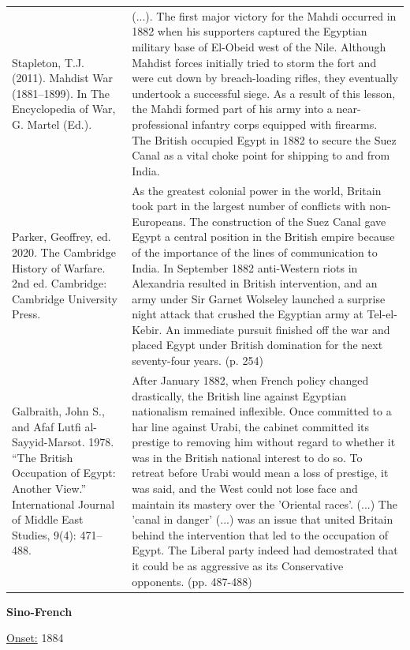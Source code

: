 {\begin{longtable}{p{}p{}}
\\
Stapleton, T.J. (2011). Mahdist War (1881–1899). In The Encyclopedia of War, G. Martel (Ed.). & (...). The first major victory for the Mahdi occurred in 1882 when his supporters captured the Egyptian military base of El-Obeid west of the Nile. Although Mahdist forces initially tried to storm the fort and were cut down by breach-loading rifles, they eventually undertook a successful siege. As a result of this lesson, the Mahdi formed part of his army into a near-professional infantry corps equipped with firearms. The British occupied Egypt in 1882 to secure the Suez Canal as a vital choke point for shipping to and from India.
\\
Parker, Geoffrey, ed. 2020. The Cambridge History of Warfare. 2nd ed. Cambridge: Cambridge University Press. & As the greatest colonial power in the world, Britain took part in the largest number of conflicts with non-Europeans. The construction of the Suez Canal gave Egypt a central position in the British empire because of the importance of the lines of communication to India. In September 1882 anti-Western riots in Alexandria resulted in British intervention, and an army under Sir Garnet Wolseley launched a surprise night attack that crushed the Egyptian army at Tel-el-Kebir. An immediate pursuit finished off the war and placed Egypt under British domination for the next seventy-four years. (p. 254)
\\
Galbraith, John S., and Afaf Lutfi al-Sayyid-Marsot. 1978. “The British Occupation of Egypt: Another View.” International Journal of Middle East Studies, 9(4): 471–488. & After January 1882, when French policy changed drastically, the British line against Egyptian nationalism remained inflexible. Once committed to a har line against Urabi, the cabinet committed its prestige to removing him without regard to whether it was in the British national interest to do so. To retreat before Urabi would mean a loss of prestige, it was said, and the West could not lose face and maintain its mastery over the 'Oriental races'. (...) The 'canal in danger' (...) was an issue that united Britain behind the intervention that led to the occupation of Egypt. The Liberal party indeed had demostrated that it could be as aggressive as its Conservative opponents. (pp. 487-488)
\\
\end{longtable}}
\clearpage
         \textbf{Sino-French} 

          \underline{Onset:} 1884         

